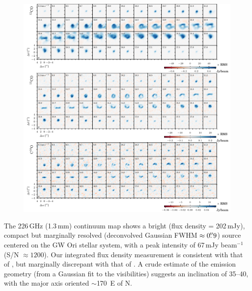 \documentclass[twocolumn]{aastex61}
\begin{document}
\begin{figure}[ht!]
\begin{center}
  \includegraphics{chmaps_all.pdf}
  \end{center}
\end{figure}

The 226\,GHz (1.3\,mm) continuum map shows a bright (flux density = 202\,mJy), compact but marginally resolved (deconvolved Gaussian FWHM $\approx 0\mbox{$.\!\!^{\prime\prime}$}9$) source centered on the GW Ori stellar system, with a peak intensity of 67\,mJy beam$^{-1}$ (S/N $\approx 1200$). Our integrated flux density measurement is consistent with that of \citet[$255 \pm 60$\,mJy]{mathieu95},  but marginally discrepant with that of \citet[$320 \pm 64$\,mJy]{fang17}. A crude estimate of the emission geometry (from a Gaussian fit to the visibilities) suggests an inclination of \mbox{35--40\degr}, with the major axis oriented $\sim$170\degr\ E of N.
\end{document}
